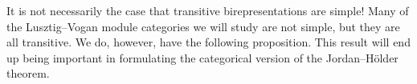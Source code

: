 \noindent It is not necessarily the case that transitive birepresentations are simple! Many of the Lusztig--Vogan module categories we will study are not simple, but they are all transitive. We do, however, have the following proposition. This result will end up being important in formulating the categorical version of the Jordan--H\"{o}lder theorem.\\ %




